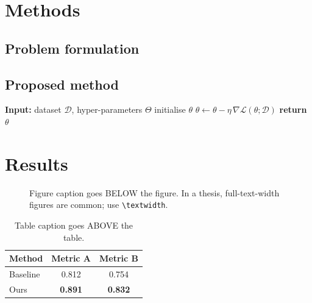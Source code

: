 \documentclass[12pt,a4paper,oneside]{book}
\begin{document}
\chapter{Methods}
\label{ch:methods}

\section{Problem formulation}

\section{Proposed method}

\begin{algorithm}[t]
\caption{Outline of the proposed method}
\label{alg:method}
\begin{algorithmic}[1]
\State \textbf{Input:} dataset $\mathcal{D}$, hyper-parameters $\Theta$
\State initialise $\theta$
    \State $\theta \leftarrow \theta - \eta\,\nabla\mathcal{L}(\theta;\mathcal{D})$
\EndWhile
\State \textbf{return} $\theta$
\end{algorithmic}
\end{algorithm}

\chapter{Results}
\label{ch:results}

\begin{figure}[t]
\centering
\fbox{\rule{0pt}{6cm}\rule{0.7\textwidth}{0pt}}
\caption{Figure caption goes BELOW the figure. In a thesis, full-text-width
figures are common; use \texttt{\textbackslash textwidth}.}
\label{fig:result}
\end{figure}

\begin{table}[t]
\caption{Table caption goes ABOVE the table.}
\label{tab:results}
\centering
\begin{tabular}{lcc}
\toprule
Method   & Metric A       & Metric B       \\
\midrule
Baseline & 0.812          & 0.754          \\
Ours     & \textbf{0.891} & \textbf{0.832} \\
\bottomrule
\end{tabular}
\end{table}
\end{document}
